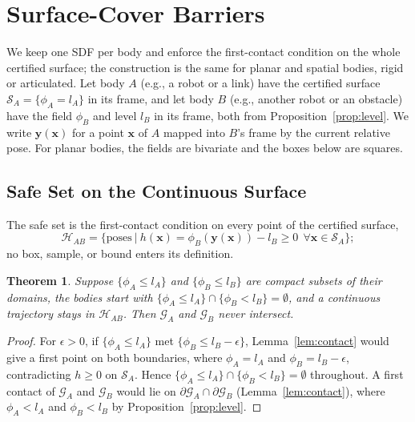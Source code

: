 \documentclass[journal]{IEEEtran}
\newtheorem{theorem}{Theorem}
\theoremstyle{definition}
\begin{document}
\section{Surface-Cover Barriers}\label{sec:cover}
We keep one SDF per body and enforce the first-contact condition on the whole certified surface; the
construction is the same for planar and spatial bodies, rigid or articulated. Let body $A$ (e.g., a
robot or a link) have the certified surface $\mathcal S_A=\{\phi_A=l_A\}$ in its frame, and let body $B$
(e.g., another robot or an obstacle) have the field $\phi_B$ and level $l_B$ in its frame, both from
Proposition~\ref{prop:level}. We write $\mathbf y(\mathbf x)$ for a point $\mathbf x$ of $A$ mapped into
$B$'s frame by the current relative pose. For planar bodies, the fields are bivariate and the boxes
below are squares.

\subsection{Safe Set on the Continuous Surface}
The safe set is the first-contact condition on every point of the certified surface,
\begin{equation}\label{eq:safe}
\mathcal H_{AB}=\big\{\text{poses}\ \big|\ h(\mathbf x)=\phi_B(\mathbf y(\mathbf x))-l_B\ge0\ \ \forall\mathbf x\in\mathcal S_A\big\};
\end{equation}
no box, sample, or bound enters its definition.
\begin{theorem}\label{thm:cover}
Suppose $\{\phi_A\le l_A\}$ and $\{\phi_B\le l_B\}$ are compact subsets of their domains, the bodies
start with $\{\phi_A\le l_A\}\cap\{\phi_B<l_B\}=\emptyset$, and a continuous trajectory stays in
$\mathcal H_{AB}$. Then $\mathcal G_A$ and $\mathcal G_B$ never intersect.
\end{theorem}
\begin{proof}
For $\epsilon>0$, if $\{\phi_A\le l_A\}$ met $\{\phi_B\le l_B-\epsilon\}$, Lemma~\ref{lem:contact} would
give a first point on both boundaries, where $\phi_A=l_A$ and $\phi_B=l_B-\epsilon$, contradicting
$h\ge0$ on $\mathcal S_A$. Hence $\{\phi_A\le l_A\}\cap\{\phi_B<l_B\}=\emptyset$ throughout. A first
contact of $\mathcal G_A$ and $\mathcal G_B$ would lie on $\partial\mathcal G_A\cap\partial\mathcal G_B$
(Lemma~\ref{lem:contact}), where $\phi_A<l_A$ and $\phi_B<l_B$ by Proposition~\ref{prop:level}.
\end{proof}
\end{document}
